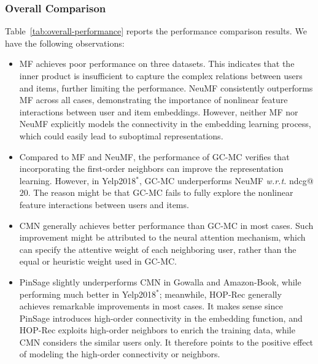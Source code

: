 \documentclass[sigconf]{acmart}
\newcommand{\wrt}{\emph{w.r.t. }}
\theoremstyle{definition}
\begin{document}
\subsubsection{\textbf{Overall Comparison}}
Table~\ref{tab:overall-performance} reports the performance comparison results.
We have the following observations:
\begin{itemize}[leftmargin=*]
\item MF achieves poor performance on three datasets. This indicates that the inner product is insufficient to capture the complex relations between users and items, further limiting the performance.
NeuMF consistently outperforms MF across all cases, demonstrating the importance of nonlinear feature interactions between user and item embeddings.
However, neither MF nor NeuMF explicitly models the connectivity in the embedding learning process, which could easily lead to suboptimal representations.

\item Compared to MF and NeuMF, the performance of GC-MC verifies that incorporating the first-order neighbors can improve the representation learning.
However, in Yelp2018$^{*}$, GC-MC underperforms NeuMF \wrt ndcg@$20$.
The reason might be that GC-MC fails to fully explore the nonlinear feature interactions between users and items.




\item CMN generally achieves better performance than GC-MC in most cases.
Such improvement might be attributed to the neural attention mechanism, which can specify the attentive weight of each neighboring user, rather than the equal or heuristic weight used in GC-MC.

\item PinSage slightly underperforms CMN in Gowalla and Amazon-Book, while performing much better in Yelp2018$^{*}$;
meanwhile, HOP-Rec generally achieves remarkable improvements in most cases.
It makes sense since PinSage introduces high-order connectivity in the embedding function, and HOP-Rec exploits high-order neighbors to enrich the training data, while CMN considers the similar users only.
It therefore points to the positive effect of modeling the high-order connectivity or neighbors.


\end{itemize}
\end{document}
